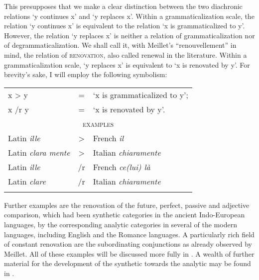 This presupposes that we make a clear distinction between the two diachronic relations ‘y continues x’ and ‘y replaces x’. Within a grammaticalization scale, the relation ‘y continues x’ is equivalent to the relation ‘x is grammaticalized to y’. However, the relation ‘y replaces x’ is neither a relation of grammaticalization nor of degrammaticalization. We shall call it, with Meillet's ``renouvellement'' in mind, the relation of \textsc{renovation}, also called renewal in the literature. Within a grammaticalization scale, ‘y replaces x’ is equivalent to ‘x is renovated by y’. For brevity's sake, I will employ the following symbolism:

%	
%	
%	
%	
%
%	

	\begin{longtable}{lcl}
		\lsptoprule
		x {\textgreater} y & = & ‘x is grammaticalized to y’;\\
		x /r y & = & ‘x is renovated by y’.\\
		\midrule
		\multicolumn{3}{c}{\textsc{examples}}\\\midrule
		Latin \textit{ille} &       {\textgreater} &  French \textit{il}\\
		Latin \textit{clara mente} & {\textgreater} &  Italian \textit{chiaramente}\\
		Latin \textit{ille}    &    /r & French \textit{ce(lui) là}\\
		Latin \textit{clare}   &   /r & Italian \textit{chiaramente}\\
		\lspbottomrule
	\end{longtable}

\newpage
Further examples are the renovation of the future, perfect, passive and adjective comparison, which had been synthetic categories in the ancient Indo-European languages, by the corresponding analytic categories in several of the modern languages, including English and the Romance languages. A particularly rich field of constant renovation are the subordinating conjunctions as already observed by Meillet. All of these examples will be discussed more fully in . A wealth of further material for the development of the synthetic towards the analytic may be found in \citet[Ch.~I]{Tauli1966}.

